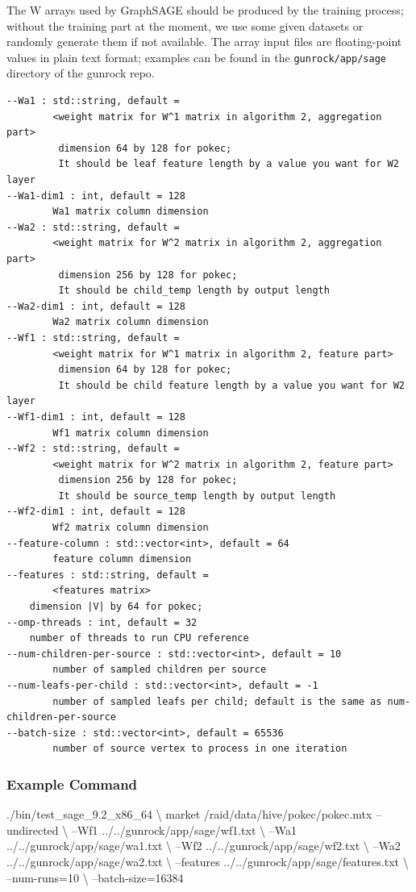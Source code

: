 \documentclass[10pt,oneside]{memoir}
\newenvironment{Shaded}{}{}
\newcommand{\ExtensionTok}[1]{#1}
\newcommand{\NormalTok}[1]{#1}
\begin{document}
The W arrays used by GraphSAGE should be produced by the training
process; without the training part at the moment, we use some given
datasets or randomly generate them if not available. The array input
files are floating-point values in plain text format; examples can be
found in the \texttt{gunrock/app/sage} directory of the gunrock repo.

\begin{verbatim}
--Wa1 : std::string, default =
        <weight matrix for W^1 matrix in algorithm 2, aggregation part>
         dimension 64 by 128 for pokec;
         It should be leaf feature length by a value you want for W2 layer
--Wa1-dim1 : int, default = 128
        Wa1 matrix column dimension
--Wa2 : std::string, default =
        <weight matrix for W^2 matrix in algorithm 2, aggregation part>
         dimension 256 by 128 for pokec;
         It should be child_temp length by output length
--Wa2-dim1 : int, default = 128
        Wa2 matrix column dimension
--Wf1 : std::string, default =
        <weight matrix for W^1 matrix in algorithm 2, feature part>
         dimension 64 by 128 for pokec;
         It should be child feature length by a value you want for W2 layer
--Wf1-dim1 : int, default = 128
        Wf1 matrix column dimension
--Wf2 : std::string, default =
        <weight matrix for W^2 matrix in algorithm 2, feature part>
         dimension 256 by 128 for pokec;
         It should be source_temp length by output length
--Wf2-dim1 : int, default = 128
        Wf2 matrix column dimension
--feature-column : std::vector<int>, default = 64
        feature column dimension
--features : std::string, default =
        <features matrix>
    dimension |V| by 64 for pokec;
--omp-threads : int, default = 32
    number of threads to run CPU reference
--num-children-per-source : std::vector<int>, default = 10
        number of sampled children per source
--num-leafs-per-child : std::vector<int>, default = -1
        number of sampled leafs per child; default is the same as num-children-per-source
--batch-size : std::vector<int>, default = 65536
        number of source vertex to process in one iteration
\end{verbatim}

\hypertarget{example-command-1}{%
\subsubsection{Example Command}\label{example-command-1}}

\begin{Shaded}
\begin{Highlighting}[]
\ExtensionTok{./bin/test_sage_9.2_x86_64}\NormalTok{ \textbackslash{}}
\NormalTok{ market /raid/data/hive/pokec/pokec.mtx  --undirected \textbackslash{}}
\NormalTok{ --Wf1 ../../gunrock/app/sage/wf1.txt \textbackslash{}}
\NormalTok{ --Wa1 ../../gunrock/app/sage/wa1.txt \textbackslash{}}
\NormalTok{ --Wf2 ../../gunrock/app/sage/wf2.txt \textbackslash{}}
\NormalTok{ --Wa2 ../../gunrock/app/sage/wa2.txt \textbackslash{}}
\NormalTok{ --features ../../gunrock/app/sage/features.txt \textbackslash{}}
\NormalTok{ --num-runs=10 \textbackslash{}}
\NormalTok{ --batch-size=16384}
\end{Highlighting}
\end{Shaded}
\end{document}
